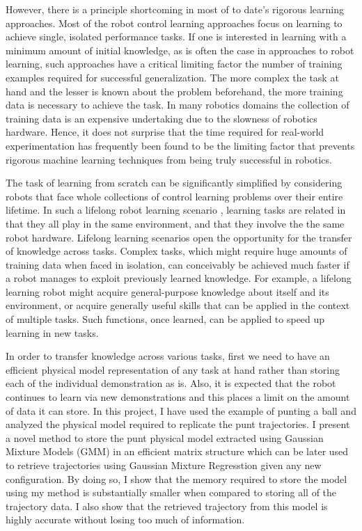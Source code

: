 \documentclass[conference]{IEEEtran}
\begin{document}
However, there is a principle shortcoming in most of to date's rigorous learning approaches. Most of the robot control learning approaches focus on learning to achieve single, isolated performance tasks. If one is interested in learning with a minimum amount of initial knowledge, as is often the case in approaches to robot learning, such approaches have a critical limiting factor the number of training examples required for successful generalization. The more complex the task at hand and the lesser is known about the problem beforehand, the more training data is necessary to achieve the task. In many robotics domains the collection of training data is an expensive undertaking due to the slowness of robotics hardware. Hence, it does not surprise that the time required for real-world experimentation has frequently been found to be the limiting factor that prevents rigorous machine learning techniques from being truly successful in robotics. 

The task of learning from scratch can be significantly simplified by considering robots that face whole collections of control learning problems over their entire lifetime. In such a lifelong robot learning scenario \cite{ref:5, ref:6}, learning tasks are related in that they all play in the same environment, and that they involve the the same robot hardware. Lifelong learning scenarios open the opportunity for the transfer of knowledge across tasks. Complex tasks, which might require huge amounts of training data when faced in isolation, can conceivably be achieved much faster if a robot manages to exploit previously learned knowledge. For example, a lifelong learning robot might acquire general-purpose knowledge about itself and its environment, or acquire generally useful skills that can be applied in the context of multiple tasks. Such functions, once learned, can be applied to speed up learning in new tasks. 

In order to transfer knowledge across various tasks, first we need to have an efficient physical model representation of any task at hand rather than storing each of the individual demonstration as is. Also, it is expected that the robot continues to learn via new demonstrations and this places a limit on the amount of data it can store. In this project, I have used the example of punting a ball and analyzed the physical model required to replicate the punt trajectories. I present a novel method to store the punt physical model extracted using Gaussian Mixture Models (GMM) in an efficient matrix structure which can be later used to retrieve trajectories using Gaussian Mixture Regresstion given any new configuration. By doing so, I show that the memory required to store the model using my method is substantially smaller when compared to storing all of the trajectory data. I also show that the retrieved trajectory from this model is highly accurate without losing too much of information.
\end{document}
